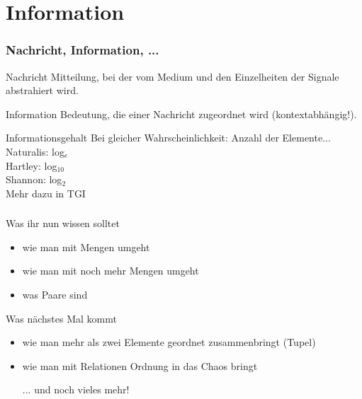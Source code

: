 \section{Information}
\begin{frame}
	\frametitle{Nachricht, Information, ...}
	
	\begin{block}{Nachricht}
		      Mitteilung, bei der vom Medium und den Einzelheiten der Signale abstrahiert wird.
	\end{block}
	
	\pause
	\begin{block}{Information}
		      Bedeutung, die einer Nachricht zugeordnet wird (kontextabhängig!).
	\end{block}
	
	\pause
	\begin{block}{Informationsgehalt}
		Bei gleicher Wahrscheinlichkeit: Anzahl der Elemente... \\
		      Naturalis: log$_{e}$ \\
		      Hartley: log$_{10}$ \\
		      Shannon: log$_{2}$ \\[1em]
		Mehr dazu in TGI
	\end{block}

\end{frame}





\begin{frame}
	\frametitle{}
	
	\begin{block}{Was ihr nun wissen solltet}
		\begin{itemize}
			\item wie man mit Mengen umgeht
			\item wie man mit noch mehr Mengen umgeht
			\item was Paare sind
		\end{itemize}
	\end{block}

	\begin{block}{Was nächstes Mal kommt}
		\begin{itemize}
			\item wie man mehr als zwei Elemente geordnet zusammenbringt (Tupel)
			\item wie man mit Relationen Ordnung in das Chaos bringt
			\item [...] und noch vieles mehr!
		\end{itemize}
	\end{block}
\end{frame}


\slideThanks



